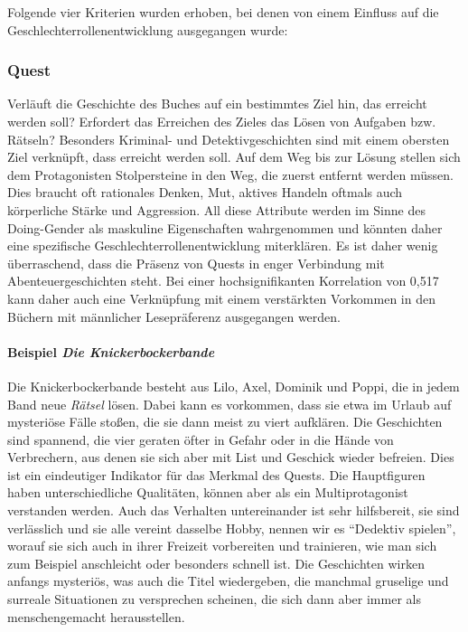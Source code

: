 Folgende vier Kriterien wurden erhoben, bei denen von einem Einfluss auf
die Geschlechterrollenentwicklung ausgegangen wurde:

\subsubsection{Quest}

Verläuft die Geschichte des Buches auf ein bestimmtes Ziel hin, das
erreicht werden soll? Erfordert das Erreichen des Zieles das Lösen von
Aufgaben bzw. Rätseln? Besonders Kriminal- und Detektivgeschichten sind
mit einem obersten Ziel verknüpft, dass erreicht werden soll. Auf dem
Weg bis zur Lösung stellen sich dem Protagonisten Stolpersteine in den
Weg, die zuerst entfernt werden müssen. Dies braucht oft rationales
Denken, Mut, aktives Handeln oftmals auch körperliche Stärke und
Aggression. All diese Attribute werden im Sinne des Doing-Gender als
maskuline Eigenschaften wahrgenommen und könnten daher eine spezifische
Geschlechterrollenentwicklung miterklären. Es ist daher wenig
überraschend, dass die Präsenz von Quests in enger Verbindung mit
Abenteuergeschichten steht. Bei einer hochsignifikanten Korrelation von
0,517 kann daher auch eine Verknüpfung mit einem verstärkten Vorkommen
in den Büchern mit männlicher Lesepräferenz ausgegangen werden.

\paragraph{Beispiel \emph{Die Knickerbockerbande}}

Die Knickerbockerbande besteht aus Lilo, Axel, Dominik und Poppi, die in
jedem Band neue \emph{Rätsel} lösen. Dabei kann es vorkommen, dass sie
etwa im Urlaub auf mysteriöse Fälle stoßen, die sie dann meist zu viert
aufklären. Die Geschichten sind spannend, die vier geraten öfter in
Gefahr oder in die Hände von Verbrechern, aus denen sie sich aber mit
List und Geschick wieder befreien. Dies ist ein eindeutiger Indikator
für das Merkmal des Quests. Die Hauptfiguren haben unterschiedliche
Qualitäten, können aber als ein Multiprotagonist verstanden werden. Auch
das Verhalten untereinander ist sehr hilfsbereit, sie sind verlässlich
und sie alle vereint dasselbe Hobby, nennen wir es ``Dedektiv spielen'',
worauf sie sich auch in ihrer Freizeit vorbereiten und trainieren, wie
man sich zum Beispiel anschleicht oder besonders schnell ist. Die
Geschichten wirken anfangs mysteriös, was auch die Titel wiedergeben,
die manchmal gruselige und surreale Situationen zu versprechen scheinen,
die sich dann aber immer als menschengemacht herausstellen.

